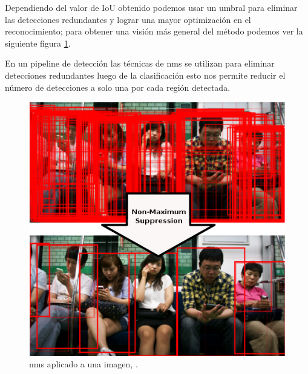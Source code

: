 Dependiendo del valor de IoU  obtenido podemos usar un umbral para  eliminar las detecciones redundantes y lograr una mayor optimización  en el reconocimiento; para obtener una visión más general del método podemos ver la siguiente figura \ref{Fig: nonmaximumsuppression}. 

En un pipeline de detección las técnicas de \ac{nms}  se utilizan para eliminar detecciones redundantes luego de la clasificación esto nos permite reducir el número de detecciones a solo una por cada región detectada.

\begin{figure}[H]
 \centering
  \includegraphics[scale=0.4,keepaspectratio=true,clip=true]{imagenes/MarcoTeorico/nms.png}
  \caption{\ac{nms} aplicado a una imagen, \citep{nms2}.}\label{Fig: nonmaximumsuppression}
\end{figure}

